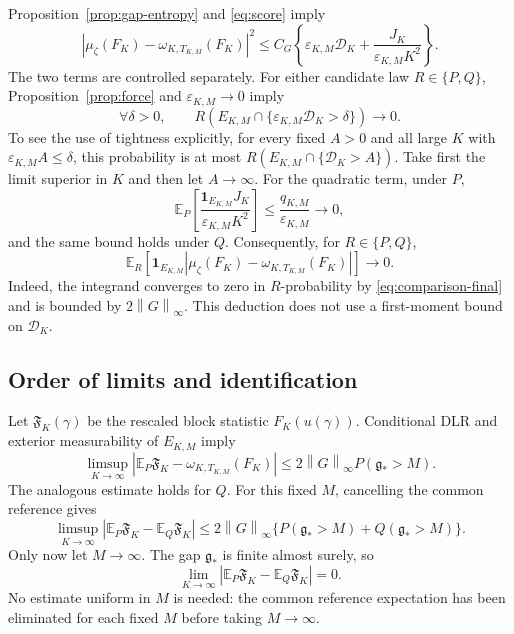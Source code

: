 \documentclass[11pt,reqno]{amsart}
\numberwithin{equation}{section}
\theoremstyle{definition}
\theoremstyle{remark}
\newcommand{\E}{\mathbb E}
\newcommand{\1}{\mathbf 1}
\newcommand{\gap}{\mathfrak g}
\newcommand{\norm}[1]{\left\lVert #1\right\rVert}
\newcommand{\abs}[1]{\left\lvert #1\right\rvert}
\begin{document}
Proposition~\ref{prop:gap-entropy} and \eqref{eq:score} imply
\begin{equation}\label{eq:comparison-final}
|\mu_\zeta(F_K)-\omega_{K,T_{K,M}}(F_K)|^2
\le C_G\left\{\varepsilon_{K,M}\mathcal D_K
                 +\frac{J_K}{\varepsilon_{K,M}K^2}\right\}.
\end{equation}
The two terms are controlled separately. For either candidate law
$R\in\{P,Q\}$, Proposition~\ref{prop:force} and
$\varepsilon_{K,M}\to0$ imply
\begin{equation}\label{eq:force-vanishing-probability}
\forall\delta>0,\qquad
R\!\left(E_{K,M}\cap
\{\varepsilon_{K,M}\mathcal D_K>\delta\}\right)\longrightarrow0.
\end{equation}
To see the use of tightness explicitly, for every fixed $A>0$ and all
large $K$ with $\varepsilon_{K,M}A\le\delta$, this probability is
at most $R(E_{K,M}\cap\{\mathcal D_K>A\})$. Take first the limit
superior in $K$ and then let $A\to\infty$. For the quadratic term, under $P$,
\[
\E_P\left[\frac{\1_{E_{K,M}}J_K}
{\varepsilon_{K,M}K^2}\right]
\le\frac{q_{K,M}}{\varepsilon_{K,M}}\longrightarrow0,
\]
and the same bound holds under $Q$.
Consequently, for $R\in\{P,Q\}$,
\begin{equation}\label{eq:conditional-comparison-L1}
\E_R\!\left[\1_{E_{K,M}}
 \left|\mu_\zeta(F_K)-\omega_{K,T_{K,M}}(F_K)\right|\right]
 \longrightarrow0.
\end{equation}
Indeed, the integrand converges to zero in $R$-probability by
\eqref{eq:comparison-final} and is bounded by $2\norm G_\infty$.
This deduction does not use a first-moment bound on $\mathcal D_K$.

\subsection{Order of limits and identification}

Let $\mathfrak F_K(\gamma)$ be the rescaled block statistic
$F_K(u(\gamma))$. Conditional DLR and exterior measurability of
$E_{K,M}$ imply
\[
\limsup_{K\to\infty}
\abs{\E_P\mathfrak F_K-\omega_{K,T_{K,M}}(F_K)}
\le2\norm G_\infty P(\gap_*>M).
\]
The analogous estimate holds for $Q$. For this fixed $M$, cancelling
the common reference gives
\[
\limsup_{K\to\infty}
\abs{\E_P\mathfrak F_K-\E_Q\mathfrak F_K}
\le2\norm G_\infty\{P(\gap_*>M)+Q(\gap_*>M)\}.
\]
Only now let $M\to\infty$. The gap $\gap_*$ is finite almost surely,
so
\begin{equation}\label{eq:cancel}
\lim_{K\to\infty}
\abs{\E_P\mathfrak F_K-\E_Q\mathfrak F_K}=0.
\end{equation}
No estimate uniform in $M$ is needed: the common reference expectation
has been eliminated for each fixed $M$ before taking $M\to\infty$.
\end{document}
